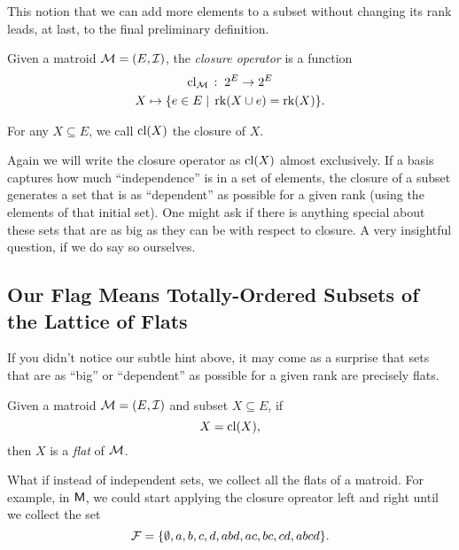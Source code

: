 \documentclass[12pt,oneside]{../../sfsuthesis}
\begin{document}
This notion that we can add more elements to a subset without changing its rank leads, at last, to the final preliminary definition.

\begin{definition}[Closure]\th\label{def:closure}
    Given a matroid \( \mathcal{M} = (E, \mathcal{I}) \), the \emph{closure operator} is a function
    \begin{gather*}
        \operatorname{cl}_{\mathcal{M}} \, : \; 2^E \to 2^E \\
        X \mapsto \{ e \in E \; | \; \operatorname{rk}(X \cup e) = \operatorname{rk}(X) \}.
    \end{gather*}

    For any \( X \subseteq E \), we call \( \operatorname{cl}(X) \) the closure of \( X \).
\end{definition}

Again we will write the closure operator as \( \operatorname{cl}(X) \) almost exclusively.
If a basis captures how much ``independence'' is in a set of elements, the closure of a subset generates a set that is as ``dependent'' as possible for a given rank (using the elements of that initial set).
One might ask if there is anything special about these sets that are as big as they can be with respect to closure.
A very insightful question, if we do say so ourselves.

\subsection{Our Flag Means Totally-Ordered Subsets of the Lattice of Flats}

If you didn't notice our subtle hint above, it may come as a surprise that sets that are as ``big'' or ``dependent'' as possible for a given rank are precisely flats.

\begin{definition}[Flat]\th\label{def:flat}
    Given a matroid \( \mathcal{M} = (E, \mathcal{I}) \) and subset \( X \subseteq E \), if
    \[
        X = \operatorname{cl}(X),
    \]
    then \( X \) is a \emph{flat} of \( \mathcal{M} \).
\end{definition}

What if instead of independent sets, we collect all the flats of a matroid.
For example, in \( \mathsf{M} \), we could start applying the closure opreator left and right until we collect the set
\[
    \mathcal{F} = \{ \emptyset, a, b, c, d, abd, ac, bc, cd, abcd \}.
\]
\end{document}
